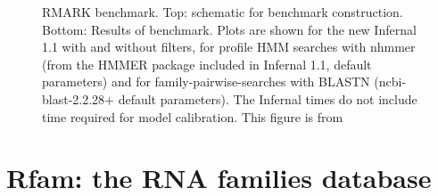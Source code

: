 \documentclass[custom,landscape,final,30pt,plainboxedsections]{sciposter-titleskipsmall}
\begin{document}
\begin{multicols}{3}

\begin{footnotesize}
\begin{figure}
\caption{
RMARK benchmark. Top: schematic for benchmark
construction. Bottom: Results of benchmark. Plots are shown for the new
Infernal 1.1 with and without filters, for
profile HMM searches with nhmmer \cite{Wheeler13b} (from the HMMER package included in
Infernal 1.1, default parameters) and for family-pairwise-searches
with BLASTN (ncbi-blast-2.2.28+ default parameters). The Infernal
times do not include time required for model calibration. This figure
is from \cite{Nawrocki13c}}
\label{fig:rmark}
\end{figure}
\end{footnotesize}

\vspace{0.5in}

\section*{Rfam: the RNA families database \cite{Nawrocki15}}


\end{multicols}
\end{document}
